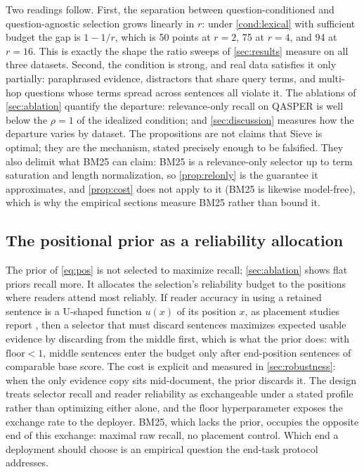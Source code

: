 \documentclass[preprint,12pt]{elsarticle}
\theoremstyle{remark}
\newcommand{\method}{Sieve}
\begin{document}
Two readings follow. First, the separation between question-conditioned
and question-agnostic selection grows linearly in $r$: under
\autoref{cond:lexical} with sufficient budget the gap is $1 - 1/r$,
which is 50 points at $r=2$, 75 at $r=4$, and 94 at $r=16$. This is
exactly the shape the ratio sweeps of \autoref{sec:results} measure on
all three datasets. Second, the condition is strong, and real data
satisfies it only partially: paraphrased evidence, distractors that
share query terms, and multi-hop questions whose terms spread across
sentences all violate it. The ablations of \autoref{sec:ablation}
quantify the departure: relevance-only recall on QASPER is well below
the $\rho = 1$ of the idealized condition; and \autoref{sec:discussion}
measures how the departure varies by dataset. The propositions are
not claims that \method{} is optimal; they are the mechanism, stated
precisely enough to be falsified. They also delimit what BM25 can
claim: BM25 is a relevance-only selector up to term saturation and
length normalization, so \autoref{prop:relonly} is the guarantee it
approximates, and \autoref{prop:cost} does not apply to it (BM25 is
likewise model-free), which is why the empirical sections measure BM25
rather than bound it.

\subsection{The positional prior as a reliability allocation}
The prior of \eqref{eq:pos} is not selected to maximize recall;
\autoref{sec:ablation} shows flat priors recall more. It allocates the
selection's reliability budget to the positions where readers attend
most reliably. If reader accuracy in using a retained sentence is a
U-shaped function $u(x)$ of its position $x$, as placement studies
report \citep{liu2023lost}, then a selector that must discard
sentences maximizes expected usable evidence by discarding from the
middle first, which is what the prior does: with
$\mathrm{floor} < 1$, middle sentences enter the budget only after
end-position sentences of comparable base score. The cost is explicit
and measured in \autoref{sec:robustness}: when the only evidence copy
sits mid-document, the prior discards it. The design treats selector
recall and reader reliability as exchangeable under a stated profile
rather than optimizing either alone, and the $\mathrm{floor}$
hyperparameter exposes the exchange rate to the deployer. BM25, which
lacks the prior, occupies the opposite end of this exchange: maximal
raw recall, no placement control. Which end a deployment should choose
is an empirical question the end-task protocol addresses.
\end{document}
